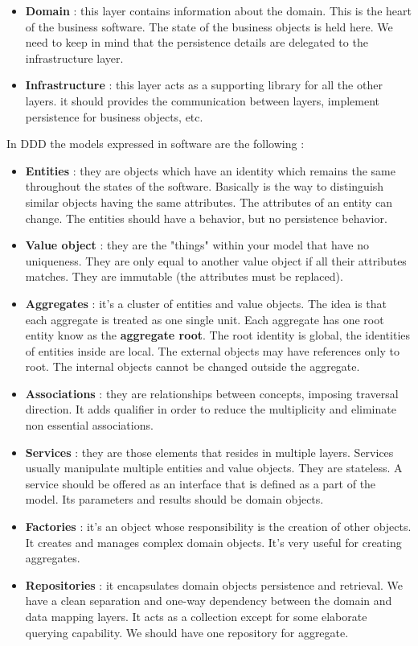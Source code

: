 \documentclass[11pt]{article}
\begin{document}
\begin{appendix}
\begin{itemize}
\item \textbf{Domain} : this layer contains information about the domain. This is the heart of the business software. The state of the business objects is held here. We need to keep in mind that the persistence details are delegated to the infrastructure layer.
\item \textbf{Infrastructure} : this layer acts as a supporting library for all the other layers. it should provides the communication between layers, implement persistence for business objects, etc.
\end{itemize}
In DDD the models expressed in software are the following :
\begin{itemize}
\item \textbf{Entities} : they are objects which have an identity which remains the same throughout the states of the software. Basically is the way to distinguish similar objects having the same attributes. The attributes of an entity can change. The entities should have a behavior, but no persistence behavior.
\item \textbf{Value object} : they are the "things" within your model that have no uniqueness. They are only equal to another value object if all their attributes matches. They are immutable (the attributes must be replaced).
\item \textbf{Aggregates} : it's a cluster of entities and value objects. The idea is that each aggregate is treated as one single unit. Each aggregate has one root entity know as the \textbf{aggregate root}. The root identity is global, the identities of entities inside are local. The external objects may have references only to root. The internal objects cannot be changed outside the aggregate.
\item \textbf{Associations} : they are relationships between concepts, imposing traversal direction. It adds qualifier in order to reduce the multiplicity and eliminate non essential associations.
\item \textbf{Services} : they are those elements that resides in multiple layers. Services usually manipulate multiple entities and value objects. They are stateless. A service should be offered as an interface that is defined as a part of the model. Its parameters and results should be domain objects.
\item \textbf{Factories} : it's an object whose responsibility is the creation of other objects. It creates and manages complex domain objects. It's very useful for creating aggregates.
\item \textbf{Repositories} : it encapsulates domain objects persistence and retrieval. We have a clean separation and one-way dependency between the domain and data mapping layers. It acts as a collection except for some elaborate querying capability. We should have one repository for aggregate.

\end{itemize}
\end{appendix}
\end{document}
